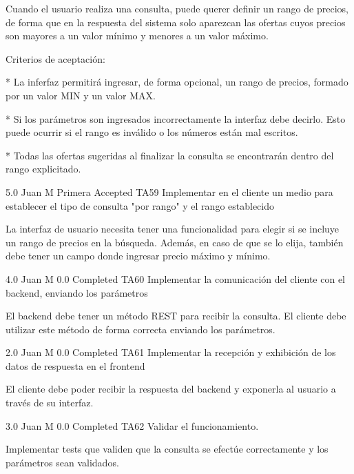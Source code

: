 	{Cuando el usuario realiza una consulta, puede querer definir un rango de
precios, de forma que en la respuesta del sistema solo aparezcan las ofertas
cuyos precios son mayores a un valor mínimo y menores a un valor máximo.

  
Criterios de aceptación:

  

* La inferfaz permitirá ingresar, de forma opcional, un rango de precios, formado por un valor MIN y un valor MAX.  

* Si los parámetros son ingresados incorrectamente la interfaz debe decirlo. Esto puede ocurrir si el rango es inválido o los números están mal escritos.

* Todas las ofertas sugeridas al finalizar la consulta se encontrarán dentro del rango explicitado.  

} %
	{} %
	{5.0} %
	{Juan M} %
	{Primera} %
	{Accepted} %
	\task
		{TA59} %
		{Implementar en el cliente un medio para establecer el tipo de consulta "por rango" y el rango establecido} %
		{La interfaz de usuario necesita tener una funcionalidad para elegir si se
incluye un rango de precios en la búsqueda. Además, en caso de que se lo
elija, también debe tener un campo donde ingresar precio máximo y mínimo.

} %
		{4.0} %
		{Juan M} %
		{0.0} %
		{Completed} %
	\task
		{TA60} %
		{Implementar la comunicación del cliente con el backend, enviando los parámetros} %
		{El backend debe tener un método REST para recibir la consulta. El cliente debe
utilizar este método de forma correcta enviando los parámetros.

} %
		{2.0} %
		{Juan M} %
		{0.0} %
		{Completed} %
	\task
		{TA61} %
		{Implementar la recepción y exhibición de los datos de respuesta en el frontend} %
		{El cliente debe poder recibir la respuesta del backend y exponerla al usuario
a través de su interfaz.

} %
		{3.0} %
		{Juan M} %
		{0.0} %
		{Completed} %
	\task
		{TA62} %
		{Validar el funcionamiento.} %
		{Implementar tests que validen que la consulta se efectúe correctamente y los
parámetros sean validados.

} %
